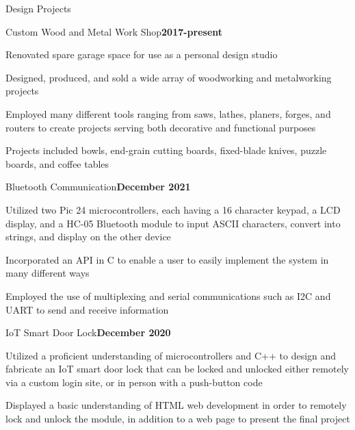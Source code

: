 \documentclass{resume} %
\begin{document}
\begin{rSection}{Design Projects}
	
	\begin{rSubsection}{Custom Wood and Metal Work Shop}{\bf 2017-present}{}{}
		
		\item Renovated spare garage space for use as a personal design studio
		
		\item Designed, produced, and sold a wide array of woodworking and metalworking projects
		
		\item Employed many different tools ranging from saws, lathes, planers, forges, and routers to create projects serving both decorative and functional purposes
		
		\item Projects included bowls, end-grain cutting boards, fixed-blade knives, puzzle boards, and coffee tables
		
	\end{rSubsection}
\begin{rSubsection}{Bluetooth Communication}{\bf December 2021}{}{}
	
	\item Utilized two Pic 24 microcontrollers, each having a 16 character keypad, a LCD display, and a HC-05 Bluetooth module to input ASCII characters, convert into strings, and  display on the other device
	
	\item Incorporated an API in C to enable a user to easily implement the system in many different ways 
	
	\item Employed the use of multiplexing and serial communications such as I2C and UART to send and receive information
	
	
\end{rSubsection}

	\begin{rSubsection}{IoT Smart Door Lock}{\bf December 2020}{}{}
	
	\item Utilized a proficient understanding of microcontrollers and C++ to design and fabricate an IoT smart door lock that can be locked and unlocked either remotely via a custom login site, or in person with a push-button code
	
	\item Displayed a basic understanding of HTML web development in order to remotely lock and unlock the module, in addition to a web page to present the final project
	

\end{rSubsection}
\end{rSection}
\end{document}
